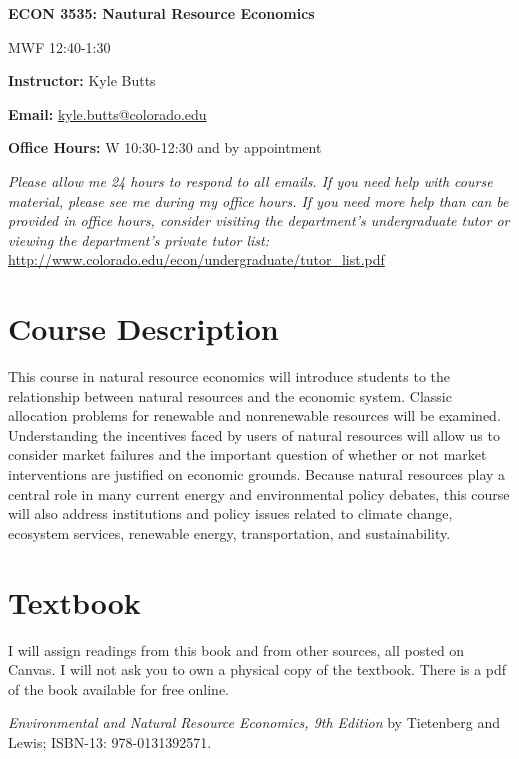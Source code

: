 \documentclass[11pt]{article}
\date{\today}
\begin{document}
\begin{center}
	{\Large \color{navyblue} \bf ECON 3535: Nautural Resource Economics}
	
	MWF 12:40-1:30
\end{center}

\vspace{.2cm}
\noindent \textbf{Instructor:} Kyle Butts

\noindent \textbf{Email:} \href{mailto:kyle.butts@colorado.edu}{kyle.butts@colorado.edu}

\noindent \textbf{Office Hours:} W 10:30-12:30 and by appointment

\vspace{5mm} \noindent \textit{Please allow me 24 hours to respond to all emails. If you need help with course material, please see me during my office hours. If you need more help than can be provided in office hours, consider visiting the department's undergraduate tutor or viewing the department's private tutor list:} \url{http://www.colorado.edu/econ/undergraduate/tutor_list.pdf}

\section*{Course Description}
This course in natural resource economics will introduce students to the relationship between natural resources and the economic system. Classic allocation problems for renewable and nonrenewable resources will be examined. Understanding the incentives faced by users of natural resources will allow us to consider market failures and the important question of whether or not market interventions are justified on economic grounds. Because natural resources play a central role in many current energy and environmental policy debates, this course will also address institutions and policy issues related to climate change, ecosystem services, renewable energy, transportation, and sustainability.


\section*{Textbook}
I will assign readings from this book and from other sources, all posted on Canvas. I will not ask you to
own a physical copy of the textbook. There is a pdf of the book available for free online.

\textit{Environmental and Natural Resource Economics, 9th Edition}
by Tietenberg and Lewis; ISBN-13: 978-0131392571.
\end{document}
